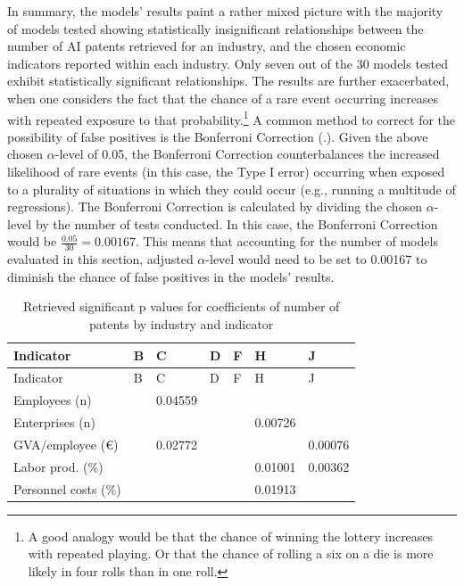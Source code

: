 \documentclass[
  12pt,
  a4paperpaper,
]{article}
\begin{document}
In summary, the models' results paint a rather mixed picture with the
majority of models tested showing statistically insignificant
relationships between the number of AI patents retrieved for an
industry, and the chosen economic indicators reported within each
industry. Only seven out of the 30 models tested exhibit statistically
significant relationships. The results are further exacerbated, when one
considers the fact that the chance of a rare event occurring increases
with repeated exposure to that probability.\footnote{A good analogy
  would be that the chance of winning the lottery increases with
  repeated playing. Or that the chance of rolling a six on a die is more
  likely in four rolls than in one roll.} A common method to correct for
the possibility of false positives is the Bonferroni Correction
(.). Given the above chosen \(\alpha\)-level of 0.05, the
Bonferroni Correction counterbalances the increased likelihood of rare
events (in this case, the Type I error) occurring when exposed to a
plurality of situations in which they could occur (e.g., running a
multitude of regressions). The Bonferroni Correction is calculated by
dividing the chosen \(\alpha\)-level by the number of tests conducted.
In this case, the Bonferroni Correction would be
\(\frac{0.05}{30}=0.00167\). This means that accounting for the number
of models evaluated in this section, adjusted \(\alpha\)-level would
need to be set to 0.00167 to diminish the chance of false positives in
the models' results.


\label{tbl-pvalues}
\begin{longtable}[]{@{}lllllll@{}}
\caption{\label{tbl-pvalues}Retrieved significant p values for
coefficients of number of patents by industry and
indicator}\tabularnewline
\toprule\noalign{}
Indicator & B & C & D & F & H & J \\
\midrule\noalign{}
\endfirsthead
\toprule\noalign{}
Indicator & B & C & D & F & H & J \\
\midrule\noalign{}
\endhead
\bottomrule\noalign{}
\endlastfoot
Employees (n) & & 0.04559 & & & & \\
Enterprises (n) & & & & & 0.00726 & \\
GVA/employee (€) & & 0.02772 & & & & 0.00076 \\
Labor prod. (\%) & & & & & 0.01001 & 0.00362 \\
Personnel costs (\%) & & & & & 0.01913 & \\
\end{longtable}
\end{document}
